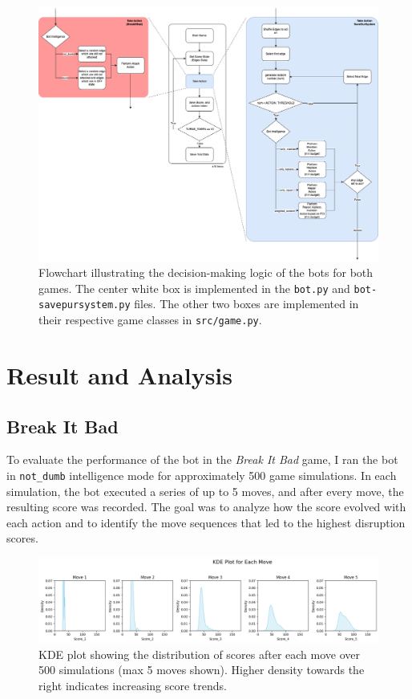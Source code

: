 \documentclass[12pt,a4paper]{article}
\begin{document}
    \begin{figure}[!htbp]
        \centering
        \includegraphics[width=0.8\textheight, angle=90]{images/bot-logic.png}
        \caption{Flowchart illustrating the decision-making logic of the bots for both games. The center white box is implemented in the \texttt{bot.py} and \texttt{bot-savepursystem.py} files. The other two boxes are implemented in their respective game classes in \texttt{src/game.py}.}
        \label{fig:bot-logic}
    \end{figure}

    \section{Result and Analysis}
    \label{sec:score-analysis}
        \subsection{Break It Bad}

        To evaluate the performance of the bot in the \textit{Break It Bad} game, I ran the bot in \texttt{not\_dumb} intelligence mode for approximately 500 game simulations. In each simulation, the bot executed a series of up to 5 moves, and after every move, the resulting score was recorded. The goal was to analyze how the score evolved with each action and to identify the move sequences that led to the highest disruption scores. 

        \begin{figure}[h!]
            \centering
            \includegraphics[width=\textwidth]{images/kde-breakitbad.png}
            \caption{KDE plot showing the distribution of scores after each move over 500 simulations (max 5 moves shown). Higher density towards the right indicates increasing score trends.}
            \label{fig:kde-breakitbad}
        \end{figure}
\end{document}
